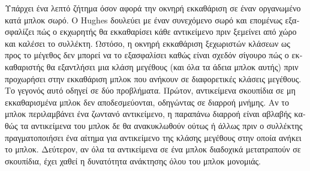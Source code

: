 \begin{greek}
Υπάρχει ένα λεπτό ζήτημα όσον αφορά την οκνηρή εκκαθάριση σε
έναν οργανωμένο κατά μπλοκ σωρό. Ο Hughes \cite{hughes1982semi} δουλεύει με 
έναν συνεχόμενο σωρό και επομένως εξασφαλίζει πώς ο εκχωρητής θα
εκκαθαρίσει κάθε αντικείμενο πριν ξεμείνει από χώρο και καλέσει
το συλλέκτη. Ωστόσο, η οκνηρή εκκαθάριση ξεχωριστών κλάσεων
ως προς το μέγεθος δεν μπορεί να το εξασφαλίσει καθώς είναι σχεδόν
σίγουρο πώς ο εκκαθαριστής θα εξαντλήσει μια κλάση μεγέθους (και
όλα τα άδεια μπλοκ αυτής) πριν προχωρήσει στην εκκαθάριση μπλοκ
που ανήκουν σε διαφορετικές κλάσεις μεγέθους. Το γεγονός αυτό
οδηγεί σε δύο προβλήματα. Πρώτον, αντικείμενα σκουπίδια σε μη
εκκαθαρισμένα μπλοκ δεν αποδεσμεύονται, οδηγώντας σε διαρροή 
μνήμης. Αν το μπλοκ περιλαμβάνει ένα ζωντανό αντικείμενο, η 
παραπάνω διαρροή είναι αβλαβής καθώς τα αντικείμενα του μπλοκ 
δε θα ανακυκλωθούν ούτως ή άλλως πριν ο συλλέκτης πραγματοποιήσει
ένα αίτημα για αντικείμενο της κλάσης μεγέθους στην οποία ανήκει
το μπλοκ. Δεύτερον, αν όλα τα αντικείμενα σε ένα μπλοκ διαδοχικά
μετατραπούν σε σκουπίδια, έχει χαθεί η δυνατότητα ανάκτησης όλου
του μπλοκ μονομιάς.


\end{greek}
